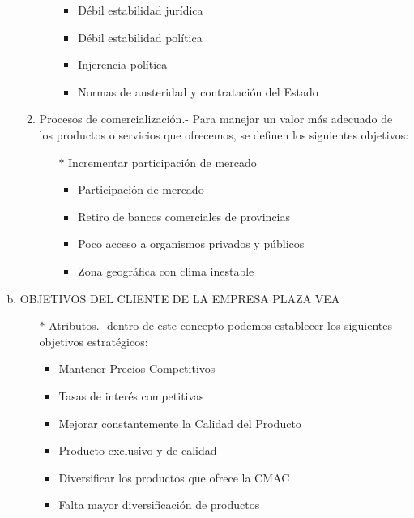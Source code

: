 \begin{enumerate}[a)]
\begin{enumerate}[1.]
\begin{itemize}
				\begin{itemize}

  				  \item Débil estabilidad jurídica
				\item Débil estabilidad política
				\item Injerencia política
				\item Normas de austeridad y contratación del Estado


				\end{itemize}
				\end{itemize}


   		\item Procesos de comercialización.- Para manejar un valor más adecuado de los productos o
servicios que ofrecemos, se definen los siguientes objetivos: 

				\begin{itemize}

				\item[$*$] Incrementar participación de mercado

				\begin{itemize}

  				  \item Participación de mercado
				\item Retiro de bancos comerciales de provincias
				\item Poco acceso a organismos privados y públicos
				\item Zona geográfica con clima inestable

				\end{itemize}

				\end{itemize}


    
		\end{enumerate}

	\item OBJETIVOS DEL CLIENTE DE LA EMPRESA PLAZA VEA

		\begin{itemize}

				\item[$*$] Atributos.- dentro de este concepto podemos establecer los siguientes objetivos estratégicos:

				\begin{itemize}

  				  \item Mantener Precios Competitivos
				\item Tasas de interés competitivas
				\item Mejorar constantemente la Calidad del Producto
				\item Producto exclusivo y de calidad
				\item Diversificar los productos que ofrece la CMAC
				\item Falta mayor diversificación de productos



\end{itemize}
\end{itemize}
\end{enumerate}
